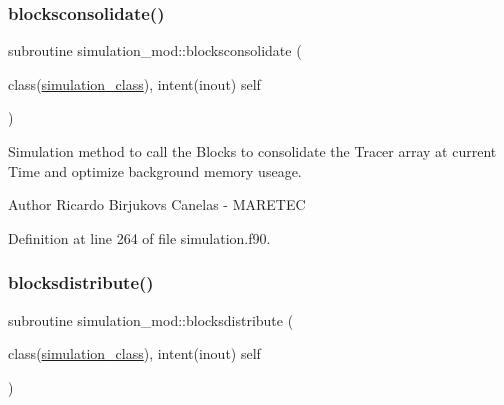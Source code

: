 \subsubsection{\texorpdfstring{blocksconsolidate()}{blocksconsolidate()}}
{\footnotesize\ttfamily subroutine simulation\+\_\+mod\+::blocksconsolidate (\begin{DoxyParamCaption}\item[{class(\mbox{\hyperlink{structsimulation__mod_1_1simulation__class}{simulation\+\_\+class}}), intent(inout)}]{self }\end{DoxyParamCaption})\hspace{0.3cm}{\ttfamily [private]}}



Simulation method to call the Blocks to consolidate the Tracer array at current Time and optimize background memory useage. 

\begin{DoxyAuthor}{Author}
Ricardo Birjukovs Canelas -\/ M\+A\+R\+E\+T\+EC 
\end{DoxyAuthor}


Definition at line 264 of file simulation.\+f90.


\mbox{\label{namespacesimulation__mod_a058892630af07fc0fe8a4bffec531c6a}} 
\subsubsection{\texorpdfstring{blocksdistribute()}{blocksdistribute()}}
{\footnotesize\ttfamily subroutine simulation\+\_\+mod\+::blocksdistribute (\begin{DoxyParamCaption}\item[{class(\mbox{\hyperlink{structsimulation__mod_1_1simulation__class}{simulation\+\_\+class}}), intent(inout)}]{self }\end{DoxyParamCaption})\hspace{0.3cm}{\ttfamily [private]}}



